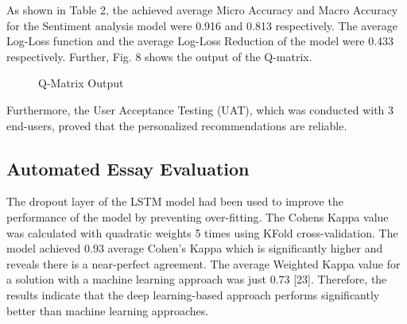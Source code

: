 \documentclass[conference]{IEEEtran}
\begin{document}
As shown in Table 2, the achieved average Micro Accuracy and Macro Accuracy for the Sentiment analysis model were 0.916 and 0.813 respectively. The average Log-Loss function and the average Log-Loss Reduction of the model were 0.433 respectively. Further, Fig. 8 shows the output of the Q-matrix.

\begin{figure}[htbp]
\small
\centerline{}
\caption{Q-Matrix Output}
\end{figure}

Furthermore, the User Acceptance Testing (UAT), which was conducted with 3 end-users, proved that the personalized recommendations are reliable.

\subsection{Automated Essay Evaluation}

The dropout layer of the LSTM model had been used to improve the performance of the model by preventing over-fitting. The Cohens Kappa value was calculated with quadratic weights 5 times using KFold cross-validation. The model achieved 0.93 average Cohen’s Kappa which is significantly higher and reveals there is a near-perfect agreement. The average Weighted Kappa value for a solution with a machine learning approach was just 0.73 [23]. Therefore, the results indicate that the deep learning-based approach performs significantly better than machine learning approaches.
\end{document}
